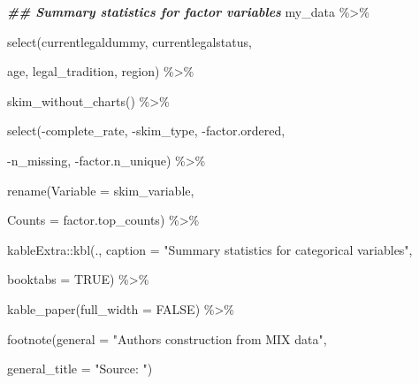 \documentclass[a4paper,nobind]{templates/ociamthesis}
\newenvironment{Shaded}{\begin{snugshade}}{\end{snugshade}}
\newcommand{\AttributeTok}[1]{\textcolor[rgb]{0.77,0.63,0.00}{#1}}
\newcommand{\ConstantTok}[1]{\textcolor[rgb]{0.00,0.00,0.00}{#1}}
\newcommand{\DocumentationTok}[1]{\textcolor[rgb]{0.56,0.35,0.01}{\textbf{\textit{#1}}}}
\newcommand{\FunctionTok}[1]{\textcolor[rgb]{0.00,0.00,0.00}{#1}}
\newcommand{\NormalTok}[1]{#1}
\newcommand{\SpecialCharTok}[1]{\textcolor[rgb]{0.00,0.00,0.00}{#1}}
\newcommand{\StringTok}[1]{\textcolor[rgb]{0.31,0.60,0.02}{#1}}
\renewenvironment{Shaded}
{
  \vspace{10pt}%
  \begin{snugshade}%
}{%
  \end{snugshade}%
  \vspace{8pt}%
}
\begin{document}
\begin{Shaded}
\begin{Highlighting}[]
\DocumentationTok{\#\# Summary statistics for factor variables }
\NormalTok{my\_data }\SpecialCharTok{\%\textgreater{}\%} 
  
  \FunctionTok{select}\NormalTok{(currentlegaldummy, currentlegalstatus, }
         
\NormalTok{         age, legal\_tradition, region) }\SpecialCharTok{\%\textgreater{}\%} 
  
  \FunctionTok{skim\_without\_charts}\NormalTok{() }\SpecialCharTok{\%\textgreater{}\%} 
  
  \FunctionTok{select}\NormalTok{(}\SpecialCharTok{{-}}\NormalTok{complete\_rate, }\SpecialCharTok{{-}}\NormalTok{skim\_type, }\SpecialCharTok{{-}}\NormalTok{factor.ordered, }
         
         \SpecialCharTok{{-}}\NormalTok{n\_missing, }\SpecialCharTok{{-}}\NormalTok{factor.n\_unique) }\SpecialCharTok{\%\textgreater{}\%} 
  
  \FunctionTok{rename}\NormalTok{(}\AttributeTok{Variable =}\NormalTok{ skim\_variable, }
         
         \AttributeTok{Counts =}\NormalTok{ factor.top\_counts) }\SpecialCharTok{\%\textgreater{}\%} 
  
\NormalTok{kableExtra}\SpecialCharTok{::}\FunctionTok{kbl}\NormalTok{(., }\AttributeTok{caption =} \StringTok{"Summary statistics for categorical variables"}\NormalTok{, }
      
  \AttributeTok{booktabs =} \ConstantTok{TRUE}\NormalTok{) }\SpecialCharTok{\%\textgreater{}\%} 
  
  \FunctionTok{kable\_paper}\NormalTok{(}\AttributeTok{full\_width =} \ConstantTok{FALSE}\NormalTok{) }\SpecialCharTok{\%\textgreater{}\%} 
  
  \FunctionTok{footnote}\NormalTok{(}\AttributeTok{general =} \StringTok{"Authors\textquotesingle{} construction from MIX data"}\NormalTok{,}
           
  \AttributeTok{general\_title =} \StringTok{"Source: "}\NormalTok{)}
\end{Highlighting}
\end{Shaded}
\end{document}
